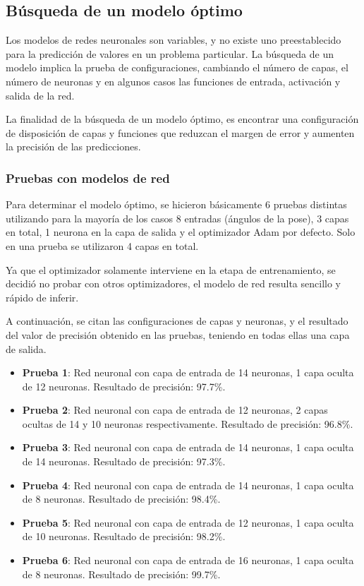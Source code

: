 \documentclass[a4paper,12pt,oneside,spanish]{book}
\begin{document}
\subsection{Búsqueda de un modelo óptimo}
Los modelos de redes neuronales son variables, y no existe uno preestablecido para la predicción de valores en un problema particular. La búsqueda de un modelo implica la prueba de configuraciones, cambiando el número de capas, el número de neuronas y en algunos casos las funciones de entrada, activación y salida de la red.\par

La finalidad de la búsqueda de un modelo óptimo, es encontrar una configuración de disposición de capas y funciones que reduzcan el margen de error y aumenten la precisión de las predicciones.\par

\subsubsection{Pruebas con modelos de red}
Para determinar el modelo óptimo, se hicieron básicamente 6 pruebas distintas utilizando para la mayoría de los casos 8 entradas (ángulos de la pose), 3 capas en total, 1 neurona en la capa de salida y el optimizador Adam por defecto. Solo en una prueba se utilizaron 4 capas en total.\par

Ya que el optimizador solamente interviene en la etapa de entrenamiento, se decidió no probar con otros optimizadores, el modelo de red resulta sencillo y rápido de inferir.\par

A continuación, se citan las configuraciones de capas y neuronas, y el resultado del valor de precisión obtenido en las pruebas, teniendo en todas ellas una capa de salida.
\begin{itemize}
	\item \textbf{Prueba 1}: 
	Red neuronal con capa de entrada de 14 neuronas, 1 capa oculta de 12 neuronas. Resultado de precisión: 97.7\%.
	\item \textbf{Prueba 2}: 
	Red neuronal con capa de entrada de 12 neuronas, 2 capas ocultas de 14 y 10 neuronas respectivamente. Resultado de precisión: 96.8\%.	
	\item \textbf{Prueba 3}: 
	Red neuronal con capa de entrada de 14 neuronas, 1 capa oculta de 14 neuronas. Resultado de precisión: 97.3\%.	
	\item \textbf{Prueba 4}: 
	Red neuronal con capa de entrada de 14 neuronas, 1 capa oculta de 8 neuronas. Resultado de precisión: 98.4\%.	
	\item \textbf{Prueba 5}: 
	Red neuronal con capa de entrada de 12 neuronas, 1 capa oculta de 10 neuronas. Resultado de precisión: 98.2\%.	
	\item \textbf{Prueba 6}: 
	Red neuronal con capa de entrada de 16 neuronas, 1 capa oculta de 8 neuronas. Resultado de precisión: 99.7\%.	
\end{itemize}
\end{document}
